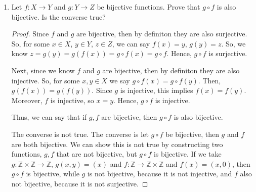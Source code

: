 \documentclass[12pt]{article}
\newcommand{\Z}{\mathbb{Z}}
\begin{document}
\begin{enumerate}
\begin{enumerate}
\end{enumerate}

\item Let $f:X\to Y$ and $g:Y\to Z$ be bijective functions. Prove that $g\circ f$ is also bijective. Is the converse true?

\begin{proof}
Since $f$ and $g$ are bijective, then by definiton they are also surjective. So, for some $x \in X$, $y \in Y$, $z \in Z$, we can say $f(x) = y$, $g(y) = z$. So, we know $z = g(y) = g(f(x)) = g \circ f(x) = g \circ f$. Hence, $g \circ f$ is surjective. 

Next, since we know $f$ and $g$ are bijective, then by definiton they are also injective. So, for some $x, y \in X$ we say $g \circ f(x) = g \circ f(y)$. Then, $g(f(x)) = g(f(y))$. Since $g$ is injective, this implies $f(x) = f(y)$. Moreover, $f$ is injective, so $x = y$. Hence, $g \circ f$ is injective. 

Thus, we can say that if $g, f$ are bijective, then $g\circ f$ is also bijective. 

The converse is not true. The converse is let $g \circ f$ be bijective, then $g$ and $f$ are both bijective. We can show this is not true by constructing two functions, $g, f$ that are not bijective, but $g \circ f$ is bijective. If we take $g: \Z \times \Z \rightarrow \Z$, $g(x, y) = (x)$ and $f: \Z \rightarrow \Z \times \Z$ and  $f(x) = (x, 0) $, then $g \circ f$ is bijective, while $g$ is not bijective, because it is not injective, and $f$ also not bijective, because it is not surjective. 
\end{proof}


\end{enumerate}
\end{document}
